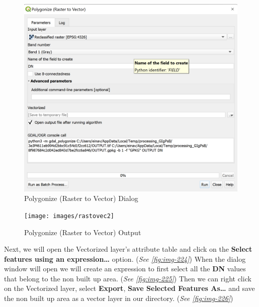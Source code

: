 \documentclass[
]{book}
\begin{document}
\begin{figure}

{\centering \includegraphics[width=0.7\linewidth]{images/rastovec1} 

}

\caption{Polygonize (Raster to Vector) Dialog}\label{fig:img-222}
\end{figure}
\begin{figure}

{\centering \texttt{[image: images/rastovec2]} 

}

\caption{Polygonize (Raster to Vector) Output}\label{fig:img-223}
\end{figure}

Next, we will open the Vectorized layer's attribute table and click on the \textbf{Select features using an expression\ldots{}} option. (\emph{See \ref{fig:img-224}})
When the dialog window will open we will create an expression to first select all the \textbf{DN} values that belong to the non built up area. (\emph{See \ref{fig:img-225}})
Then we can right click on the Vectorized layer, select \textbf{Export}, \textbf{Save Selected Features As\ldots{}} and save the non built up area as a vector layer in our directory. (\emph{See \ref{fig:img-226}})
\end{document}
